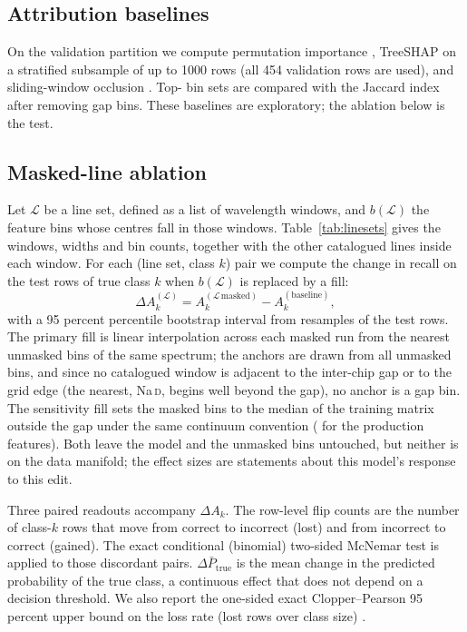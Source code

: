 \documentclass[11pt,a4paper]{article}
\newcommand{\NaD}{Na\,\textsc{d}\xspace}
\newcommand{\dA}{\Delta A}
\begin{document}
\subsection{Attribution baselines}
\label{subsec:triangulation}

On the validation partition we compute permutation importance \citep[10 repeats, accuracy scoring;][]{Breiman2001RF}, TreeSHAP \citep{LundbergLee2017SHAP,Lundberg2020TreeSHAP} on a stratified subsample of up to 1000 rows (all 454 validation rows are used), and sliding-window occlusion \citep[50~\AA{} window, 25~\AA{} stride, masked bins set to 1.0, a convention that predates the ablation fills;][]{ZeilerFergus2014}. Top-\triTopK{} bin sets are compared with the Jaccard index after removing gap bins. These baselines are exploratory; the ablation below is the test.

\subsection{Masked-line ablation}
\label{subsec:ablation}

Let $\mathcal{L}$ be a line set, defined as a list of wavelength windows, and $b(\mathcal{L})$ the feature bins whose centres fall in those windows. Table~\ref{tab:linesets} gives the windows, widths and bin counts, together with the other catalogued lines inside each window. For each (line set, class $k$) pair we compute the change in recall on the test rows of true class $k$ when $b(\mathcal{L})$ is replaced by a fill:
\begin{equation}
\dA_k^{(\mathcal{L})} = A_k^{(\mathcal{L}\,\text{masked})} - A_k^{(\text{baseline})},
\label{eq:delta-acc}
\end{equation}
with a 95 percent percentile bootstrap interval from \ablNBoot{} resamples of the test rows. The primary fill is linear interpolation across each masked run from the nearest unmasked bins of the same spectrum; the anchors are drawn from all unmasked bins, and since no catalogued window is adjacent to the inter-chip gap or to the grid edge (the nearest, \NaD, begins well beyond the gap), no anchor is a gap bin. The sensitivity fill sets the masked bins to the median of the training matrix outside the gap under the same continuum convention (\ablFillTrainProd{} for the production features). Both leave the model and the unmasked bins untouched, but neither is on the data manifold; the effect sizes are statements about this model's response to this edit.

Three paired readouts accompany $\dA_k$. The row-level flip counts are the number of class-$k$ rows that move from correct to incorrect (lost) and from incorrect to correct (gained). The exact conditional (binomial) two-sided McNemar test \citep{McNemar1947,Fagerland2013McNemar} is applied to those discordant pairs. $\Delta\bar{P}_{\mathrm{true}}$ is the mean change in the predicted probability of the true class, a continuous effect that does not depend on a decision threshold. We also report the one-sided exact Clopper--Pearson 95 percent upper bound on the loss rate (lost rows over class size) \citep{ClopperPearson1934}.
\end{document}
